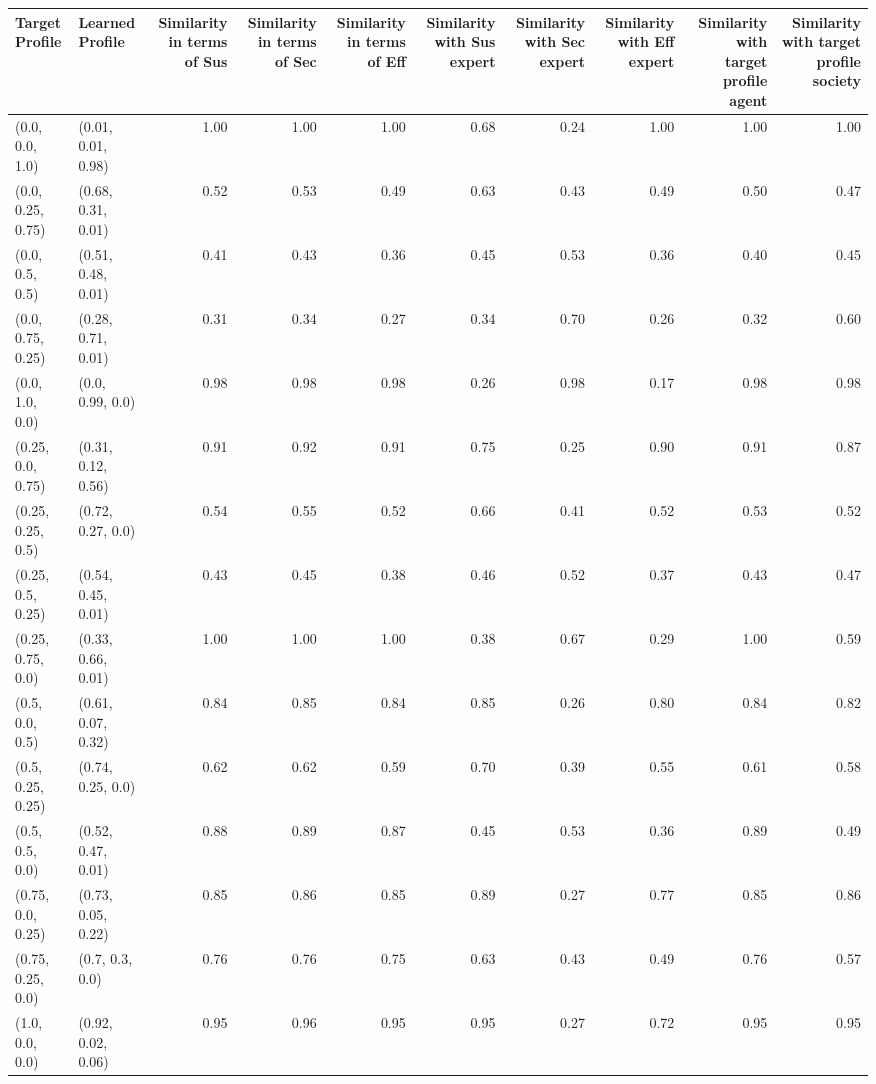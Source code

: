\begin{tabular}{llrrrrrrrr}
\toprule
Target Profile & Learned Profile & Similarity in terms of Sus & Similarity in terms of Sec & Similarity in terms of Eff & Similarity with Sus expert & Similarity with Sec expert & Similarity with Eff expert & Similarity with target profile agent & Similarity with target profile society \\
\midrule
(0.0, 0.0, 1.0) & (0.01, 0.01, 0.98) & 1.00 & 1.00 & 1.00 & 0.68 & 0.24 & 1.00 & 1.00 & 1.00 \\
(0.0, 0.25, 0.75) & (0.68, 0.31, 0.01) & 0.52 & 0.53 & 0.49 & 0.63 & 0.43 & 0.49 & 0.50 & 0.47 \\
(0.0, 0.5, 0.5) & (0.51, 0.48, 0.01) & 0.41 & 0.43 & 0.36 & 0.45 & 0.53 & 0.36 & 0.40 & 0.45 \\
(0.0, 0.75, 0.25) & (0.28, 0.71, 0.01) & 0.31 & 0.34 & 0.27 & 0.34 & 0.70 & 0.26 & 0.32 & 0.60 \\
(0.0, 1.0, 0.0) & (0.0, 0.99, 0.0) & 0.98 & 0.98 & 0.98 & 0.26 & 0.98 & 0.17 & 0.98 & 0.98 \\
(0.25, 0.0, 0.75) & (0.31, 0.12, 0.56) & 0.91 & 0.92 & 0.91 & 0.75 & 0.25 & 0.90 & 0.91 & 0.87 \\
(0.25, 0.25, 0.5) & (0.72, 0.27, 0.0) & 0.54 & 0.55 & 0.52 & 0.66 & 0.41 & 0.52 & 0.53 & 0.52 \\
(0.25, 0.5, 0.25) & (0.54, 0.45, 0.01) & 0.43 & 0.45 & 0.38 & 0.46 & 0.52 & 0.37 & 0.43 & 0.47 \\
(0.25, 0.75, 0.0) & (0.33, 0.66, 0.01) & 1.00 & 1.00 & 1.00 & 0.38 & 0.67 & 0.29 & 1.00 & 0.59 \\
(0.5, 0.0, 0.5) & (0.61, 0.07, 0.32) & 0.84 & 0.85 & 0.84 & 0.85 & 0.26 & 0.80 & 0.84 & 0.82 \\
(0.5, 0.25, 0.25) & (0.74, 0.25, 0.0) & 0.62 & 0.62 & 0.59 & 0.70 & 0.39 & 0.55 & 0.61 & 0.58 \\
(0.5, 0.5, 0.0) & (0.52, 0.47, 0.01) & 0.88 & 0.89 & 0.87 & 0.45 & 0.53 & 0.36 & 0.89 & 0.49 \\
(0.75, 0.0, 0.25) & (0.73, 0.05, 0.22) & 0.85 & 0.86 & 0.85 & 0.89 & 0.27 & 0.77 & 0.85 & 0.86 \\
(0.75, 0.25, 0.0) & (0.7, 0.3, 0.0) & 0.76 & 0.76 & 0.75 & 0.63 & 0.43 & 0.49 & 0.76 & 0.57 \\
(1.0, 0.0, 0.0) & (0.92, 0.02, 0.06) & 0.95 & 0.96 & 0.95 & 0.95 & 0.27 & 0.72 & 0.95 & 0.95 \\
\bottomrule
\end{tabular}
